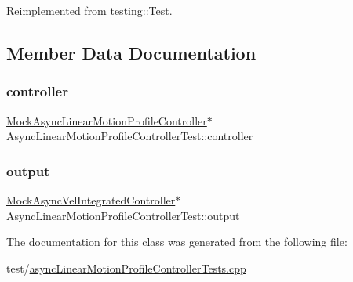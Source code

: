 Reimplemented from \mbox{\hyperlink{classtesting_1_1Test_a5f0ab439802cbe0ef7552f1a9f791923}{testing\+::\+Test}}.



\subsection{Member Data Documentation}
\mbox{\label{classAsyncLinearMotionProfileControllerTest_ac611e59231a63010be1b4e3734b1f5d9}} 
\subsubsection{\texorpdfstring{controller}{controller}}
{\footnotesize\ttfamily \mbox{\hyperlink{classMockAsyncLinearMotionProfileController}{Mock\+Async\+Linear\+Motion\+Profile\+Controller}}$\ast$ Async\+Linear\+Motion\+Profile\+Controller\+Test\+::controller\hspace{0.3cm}{\ttfamily [protected]}}

\mbox{\label{classAsyncLinearMotionProfileControllerTest_a21a36d7ecc0800d0ecb1676498747bbb}} 
\subsubsection{\texorpdfstring{output}{output}}
{\footnotesize\ttfamily \mbox{\hyperlink{classokapi_1_1MockAsyncVelIntegratedController}{Mock\+Async\+Vel\+Integrated\+Controller}}$\ast$ Async\+Linear\+Motion\+Profile\+Controller\+Test\+::output\hspace{0.3cm}{\ttfamily [protected]}}



The documentation for this class was generated from the following file\+:\begin{DoxyCompactItemize}
\item 
test/\mbox{\hyperlink{asyncLinearMotionProfileControllerTests_8cpp}{async\+Linear\+Motion\+Profile\+Controller\+Tests.\+cpp}}\end{DoxyCompactItemize}
